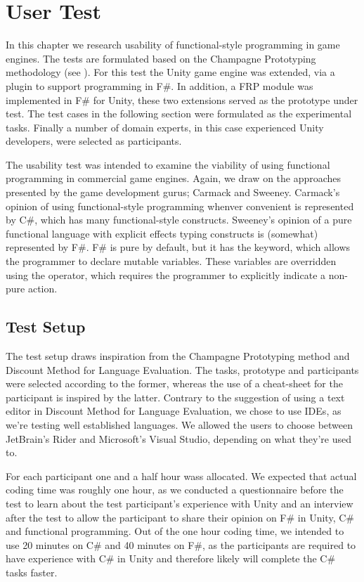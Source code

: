 \chapter{User Test}
In this chapter we research usability of functional-style programming in game engines. The tests are formulated based on the Champagne Prototyping methodology (see ). For this test the Unity game engine was extended, via a plugin to support programming in F\#\cite{fsharp2019plugin}. In addition, a \gls{FRP} module was implemented in F\# for Unity, these two extensions served as the prototype under test. The test cases in the following section were formulated as the experimental tasks. Finally a number of domain experts, in this case experienced Unity developers, were selected as participants. 

The usability test was intended to examine the viability of using functional programming in commercial game engines. Again, we draw on the approaches presented by the game development gurus; Carmack and Sweeney. Carmack's opinion of using functional-style programming whenver convenient is represented by C\#, which has many functional-style constructs. Sweeney's opinion of a pure functional language with explicit effects typing constructs is (somewhat) represented by F\#. F\# is pure by default, but it has the  keyword, which allows the programmer to declare mutable variables. These variables are overridden using the \ttt{\textless-} operator, which requires the programmer to explicitly indicate a non-pure action.
 
\section{Test Setup}
The test setup draws inspiration from the Champagne Prototyping method and Discount Method for Language Evaluation. The tasks, prototype and participants were selected according to the former, whereas the use of a cheat-sheet for the participant is inspired by the latter. Contrary to the suggestion of using a text editor in Discount Method for Language Evaluation, we chose to use \glspl{IDE}, as we're testing well established languages. We allowed the users to choose between JetBrain's Rider and Microsoft's Visual Studio, depending on what they're used to.

For each participant one and a half hour wass allocated. We expected that actual coding time was roughly one hour, as we conducted a questionnaire before the test to learn about the test participant's experience with Unity and an interview after the test to allow the participant to share their opinion on F\# in Unity, C\# and functional programming. Out of the one hour coding time, we intended to use 20 minutes on C\# and 40 minutes on F\#, as the participants are required to have experience with C\# in Unity and therefore likely will complete the C\# tasks faster.

